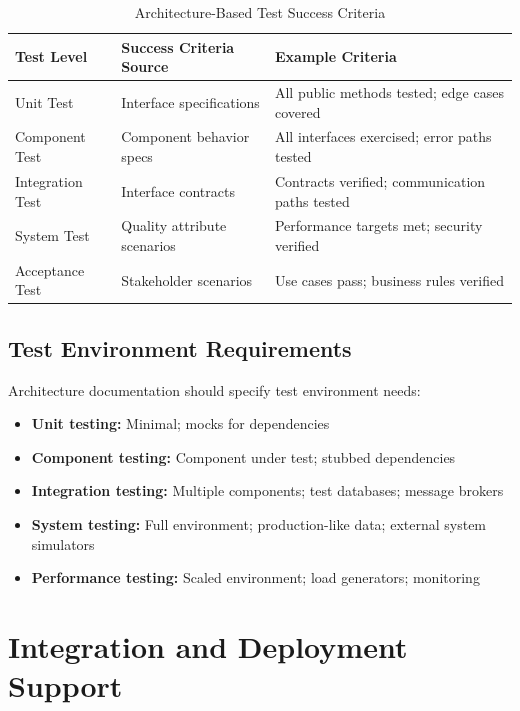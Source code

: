 \documentclass[11pt]{article}
\begin{document}
\begin{longtable}{@{}L{2.5cm} L{4cm} L{6cm}@{}}
\caption{Architecture-Based Test Success Criteria} \\
\toprule
\textbf{Test Level} & \textbf{Success Criteria Source} & \textbf{Example Criteria} \\
\midrule
\endfirsthead
\bottomrule
\endlastfoot
Unit Test & Interface specifications & All public methods tested; edge cases covered \\
Component Test & Component behavior specs & All interfaces exercised; error paths tested \\
Integration Test & Interface contracts & Contracts verified; communication paths tested \\
System Test & Quality attribute scenarios & Performance targets met; security verified \\
Acceptance Test & Stakeholder scenarios & Use cases pass; business rules verified \\
\end{longtable}

\subsection{Test Environment Requirements}

Architecture documentation should specify test environment needs:

\begin{itemize}
    \item \textbf{Unit testing:} Minimal; mocks for dependencies
    \item \textbf{Component testing:} Component under test; stubbed dependencies
    \item \textbf{Integration testing:} Multiple components; test databases; message brokers
    \item \textbf{System testing:} Full environment; production-like data; external system simulators
    \item \textbf{Performance testing:} Scaled environment; load generators; monitoring
\end{itemize}

\section{Integration and Deployment Support}
\end{document}
